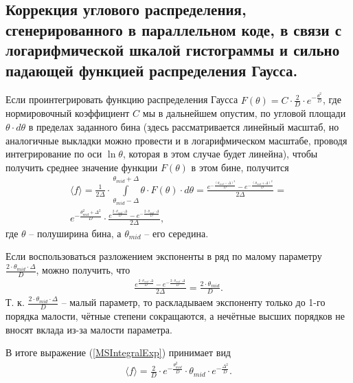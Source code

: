 \documentclass[a4paper,12pt]{article}
\begin{document}
\begin{large}
\subsection{Коррекция углового распределения, сгенерированного в параллельном коде, в связи с логарифмической шкалой гистограммы и сильно падающей функцией распределения Гаусса.}
\label{subValMS4}

	Если проинтегрировать функцию распределения Гаусса $F(\theta)=C \cdot \frac{2}{D} \cdot e^{-\frac{\theta^2}{D}}$, где нормировочный коэффициент $C$ мы в дальнейшем опустим, по угловой площади $\theta \cdot d\theta$ в пределах заданного бина (здесь рассматривается линейный масштаб, но аналогичные выкладки можно провести и в логарифмическом масштабе, проводя интегрирование по оси $\ln{\theta}$, которая в этом случае будет линейна), чтобы получить среднее значение функции $F(\theta)$ в этом бине, получится
\begin{equation}
\label{MSIntegralExp}
\begin{aligned} 
  \langle f \rangle = \frac{1}{2\Delta} \cdot \int \limits_{\theta_{mid} - \Delta}^{\theta_{mid} + \Delta} \theta \cdot F(\theta) \cdot d \theta =
  \frac{e^{-\frac{\left( \theta_{mid} - \Delta \right)^2}{D}} - e^{-\frac{\left( \theta_{mid} + \Delta \right)^2}{D}}}{2\Delta} = \\
  e^{-\frac{\theta^2_{mid} + \Delta^2}{D}} \cdot \frac{ e^{\frac{2 \cdot \theta_{mid} \cdot \Delta}{D}} - e^{-\frac{2 \cdot \theta_{mid} \cdot \Delta}{D}} }{2\Delta},
\end{aligned}
\end{equation}
где $\theta$ -- полуширина бина, а $\theta_{mid}$ -- его середина.

	Если воспользоваться разложением экспоненты в ряд по малому параметру $\frac{2 \cdot \theta_{mid} \cdot \Delta}{D}$, можно получить, что
\begin{equation}
\label{MSIntegralExpand}
\begin{aligned} 
  \frac{ e^{\frac{2 \cdot \theta_{mid} \cdot \Delta}{D}} - e^{-\frac{2 \cdot \theta_{mid} \cdot \Delta}{D}} }{2\Delta} =
  \frac{2 \cdot \theta_{mid}}{D}.
\end{aligned}
\end{equation}
Т. к. $\frac{2 \cdot \theta_{mid} \cdot \Delta}{D}$ -- малый параметр, то раскладываем экспоненту только до 1-го порядка малости, чётные степени сокращаются, а нечётные высших порядков не вносят вклада из-за малости параметра.

	В итоге выражение (\ref{MSIntegralExp}) принимает вид
\begin{equation}
\label{MSIntegralFin}
\begin{aligned} 
  \langle f \rangle = \frac{2}{D} \cdot e^{-\frac{\theta^2_{mid}}{D}} \cdot \theta_{mid} \cdot e^{-\frac{\Delta^2}{D}} .
\end{aligned}
\end{equation}


\end{large}
\end{document}
